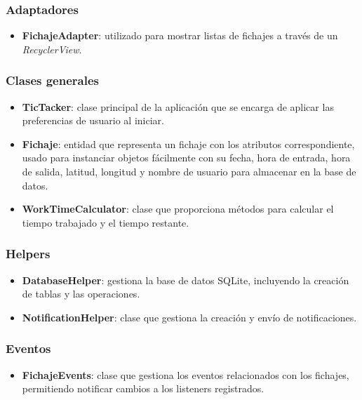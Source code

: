 \subsubsection{Adaptadores}
\begin{itemize}
  \item \textbf{FichajeAdapter}: utilizado para mostrar listas de fichajes a través de un \textit{RecyclerView}.
\end{itemize}

\subsubsection{Clases generales}
\begin{itemize}
  \item \textbf{TicTacker}: clase principal de la aplicación que se encarga de aplicar las preferencias de usuario al iniciar.
  \item \textbf{Fichaje}: entidad que representa un fichaje con los atributos correspondiente, usado para instanciar objetos fácilmente con su fecha, hora de entrada, hora de salida, latitud, longitud y nombre de usuario para almacenar en la base de datos.
  \item \textbf{WorkTimeCalculator}: clase que proporciona métodos para calcular el tiempo trabajado y el tiempo restante.
\end{itemize}

\subsubsection{Helpers}
\begin{itemize}
  \item \textbf{DatabaseHelper}: gestiona la base de datos SQLite, incluyendo la creación de tablas y las operaciones.
  \item \textbf{NotificationHelper}: clase que gestiona la creación y envío de notificaciones.
\end{itemize}

\subsubsection{Eventos}
\begin{itemize}
  \item \textbf{FichajeEvents}: clase que gestiona los eventos relacionados con los fichajes, permitiendo notificar cambios a los listeners registrados.
\end{itemize}

